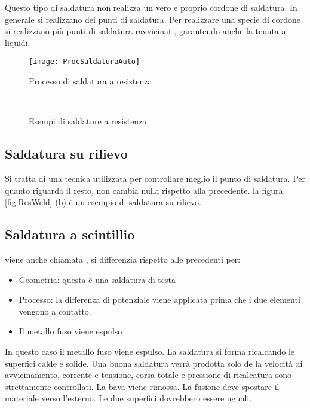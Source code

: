 Questo tipo di saldatura non realizza un vero e proprio cordone di saldatura. In generale si realizzano dei punti di saldatura.
Per realizzare una specie di cordone si realizzano più punti di saldatura ravvicinati, garantendo anche la tenuta ai liquidi.

\begin{figure}
\centering
\texttt{[image: ProcSaldaturaAuto]}
\caption{Processo di saldatura a resistenza}
\label{fig:ProcSaldaturaAuto}
\end{figure}

\begin{figure}
\centering
{}\quad
{}\\
\caption{Esempi di saldature a resistenza}
\label{fig:ResistanceWeld}
\end{figure}

\subsection{Saldatura su rilievo}
Si tratta di una tecnica utilizzata per controllare meglio il punto di saldatura. Per quanto riguarda il resto, non cambia nulla rispetto alla precedente.
la figura \ref{fig:ResWeld} (b) è un esempio di saldatura su rilievo.

\subsection{Saldatura a scintillio}
viene anche chiamata , si differenzia rispetto alle precedenti per:
\begin{itemize}
\item Geometria: questa è una saldatura di testa
\item Processo: la differenza di potenziale viene applicata prima che i due elementi vengono a contatto.
\item Il metallo fuso viene espulso
\end{itemize}

In questo caso il metallo fuso viene espulso.
La saldatura si forma ricalcando le superfici calde e solide.
Una buona saldatura verrà prodotta solo de la velocità di avvicinamento, corrente e tensione, corsa totale e pressione di ricalcatura sono strettamente controllati.
La bava viene rimossa. La fusione deve spostare il materiale verso l'esterno.
Le due superfici dovrebbero essere uguali.

